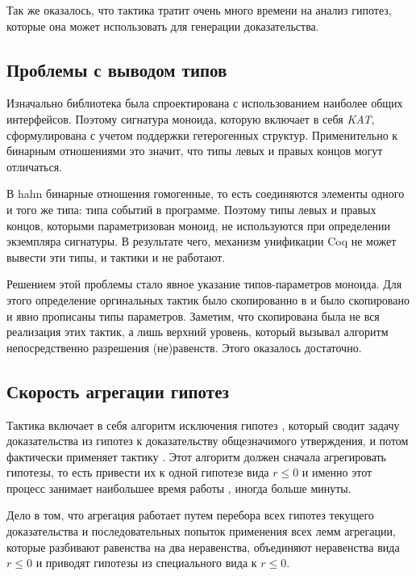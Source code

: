 \documentclass[times
              ,specification
              ,annotation
              ]{itmo-student-thesis}
\begin{document}
    Так же оказалось, что тактика  тратит очень много времени на анализ гипотез, которые она
    может использовать для генерации доказательства.
    \subsection{Проблемы с выводом типов}
      Изначально библиотека была спроектирована с использованием наиболее общих интерфейсов. Поэтому
      сигнатура моноида, которую включает в себя \textit{KAT}, сформулирована с учетом
      поддержки гетерогенных структур.
      Применительно к бинарным отношениями это значит, что типы левых и правых концов могут
      отличаться.

      В hahn бинарные отношения гомогенные, то есть соединяются элементы одного и того же
      типа: типа событий в программе. Поэтому типы левых и правых концов, которыми
      параметризован моноид, не
      используются при определении экземпляра сигнатуры. В результате чего, механизм унификации Coq не
      может вывести эти типы, и тактики  и  не работают.

      Решением этой проблемы стало явное указание типов-параметров моноида. Для этого определение
      оргинальных тактик  было скопированно в  и 
      было скопировано и явно прописаны типы параметров. Заметим, что
      скопирована была не вся реализация этих тактик, а лишь верхний уровень, который вызывал
      алгоритм непосредственно разрешения (не)равенств. Этого оказалось достаточно.

    \subsection{Скорость агрегации гипотез}

      Тактика  включает в себя алгоритм исключения гипотез \cite{hkat,hkat_cpc}, который
      сводит задачу доказательства из гипотез к доказательству общезначимого утверждения,
      и потом фактически применяет тактику . Этот алгоритм должен сначала агрегировать
      гипотезы, то есть привести их к одной гипотезе вида
      $r \leq 0$ и именно этот процесс занимает наибольшее время работы , иногда больше минуты.

      Дело в том, что агрегация работает путем перебора всех гипотез текущего доказательства и
      последовательных попыток
      применения всех лемм агрегации, которые разбивают равенства на два неравенства,
      объединяют неравенства вида $r \leq 0$ и приводят гипотезы из специального вида к $r \leq 0$.
\end{document}
